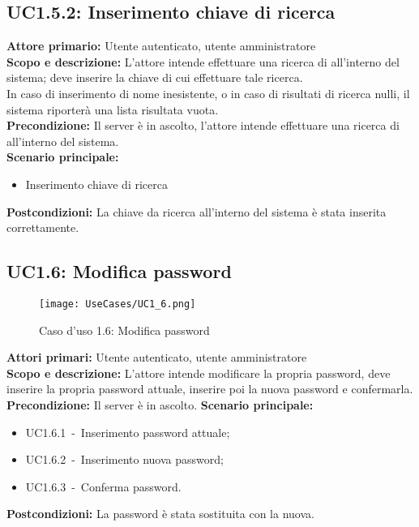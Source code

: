 \documentclass{scalatekids-article}
\begin{document}
\subsection{UC1.5.2: Inserimento chiave di ricerca}

\textbf{Attore primario:} Utente autenticato, utente amministratore\\
\textbf{Scopo e descrizione:} L'attore intende effettuare una ricerca di  all'interno del sistema; deve inserire la chiave di cui effettuare tale ricerca.\\
In caso di inserimento di nome  inesistente, o in caso di risultati di ricerca nulli, il sistema riporterà una lista risultata vuota.\\ %
\textbf{Precondizione:} Il server è in ascolto, l'attore intende effettuare una ricerca di  all'interno del  sistema.\\
\textbf{Scenario principale:}
\begin{itemize}
\item Inserimento chiave di ricerca
\end{itemize}
\textbf{Postcondizioni:} La chiave da ricerca all'interno del sistema è stata inserita correttamente.

\subsection{UC1.6: Modifica password}
\begin{figure}[H]
  \begin{center}
    \texttt{[image: UseCases/UC1\_6.png]}
    \caption*{Caso d'uso 1.6: Modifica password}
  \end{center}
\end{figure}
\textbf{Attori primari:} Utente autenticato, utente amministratore\\
\textbf{Scopo e descrizione:} L'attore intende modificare la propria password, deve inserire la propria password attuale, inserire poi la nuova password e confermarla.\\
\textbf{Precondizione:} Il server è in ascolto.
\textbf{Scenario principale:}
\begin{itemize}
\item UC1.6.1\ -\ Inserimento password attuale;
\item UC1.6.2\ -\ Inserimento nuova password;
\item UC1.6.3\ -\ Conferma password.
\end{itemize}
\textbf{Postcondizioni:} La password è stata sostituita con la nuova.
\end{document}
